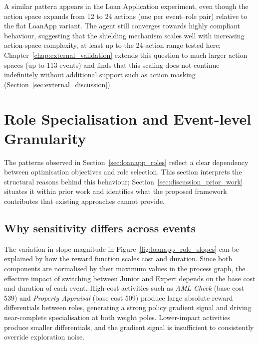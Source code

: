 A similar pattern appears in the Loan Application experiment, even though the action space expands from 12 to 24 actions (one per event--role pair) relative to the flat LoanApp variant. The agent still converges towards highly compliant behaviour, suggesting that the shielding mechanism scales well with increasing action-space complexity, at least up to the 24-action range tested here; Chapter~\ref{chap:external_validation} extends this question to much larger action spaces (up to 113 events) and finds that this scaling does not continue indefinitely without additional support such as action masking (Section~\ref{sec:external_discussion}).

\section{Role Specialisation and Event-level Granularity}
\label{sec:discussion_roles}

The patterns observed in Section~\ref{sec:loanapp_roles} reflect a clear dependency between optimisation objectives and role selection. This section interprets the structural reasons behind this behaviour; Section~\ref{sec:discussion_prior_work} situates it within prior work and identifies what the proposed framework contributes that existing approaches cannot provide.

\subsection{Why sensitivity differs across events}

The variation in slope magnitude in Figure~\ref{fig:loanapp_role_slopes} can be explained by how the reward function scales cost and duration. Since both components are normalised by their maximum values in the process graph, the effective impact of switching between Junior and Expert depends on the base cost and duration of each event. High-cost activities such as \textit{AML Check} (base cost 539) and \textit{Property Appraisal} (base cost 509) produce large absolute reward differentials between roles, generating a strong policy gradient signal and driving near-complete specialisation at both weight poles. Lower-impact activities produce smaller differentials, and the gradient signal is insufficient to consistently override exploration noise.

